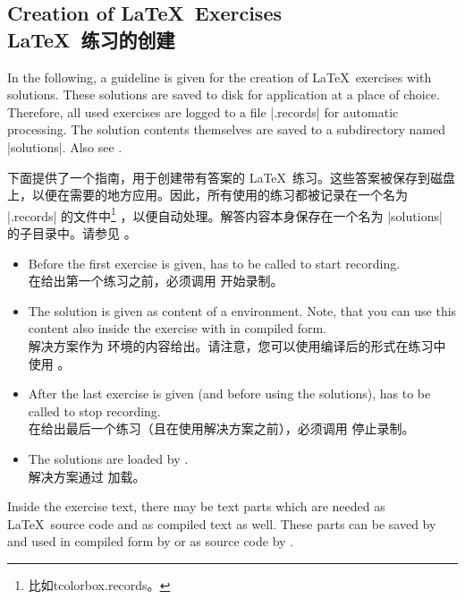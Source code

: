 \subsection{Creation of \LaTeX\ Exercises\\\LaTeX\ 练习的创建}\label{listing:exercises}

In the following, a guideline is given for the creation of \LaTeX\ exercises
with solutions. These solutions are saved to disk for application at a place of
choice.
Therefore, all used exercises are logged to a file |\jobname.records| for automatic
processing. The solution contents themselves are saved to a subdirectory named
|solutions|. Also see .

下面提供了一个指南，用于创建带有答案的 \LaTeX\ 练习。这些答案被保存到磁盘上，以便在需要的地方应用。因此，所有使用的练习都被记录在一个名为 |\jobname.records| 的文件中\footnote{比如tcolorbox.records。}%
，以便自动处理。解答内容本身保存在一个名为 |solutions| 的子目录中。请参见 。
\begin{itemize}
\item Before the first exercise is given,
 has to be called to start recording.
\\在给出第一个练习之前，必须调用  开始录制。
\item The solution is given as content of a 
environment. Note, that you can use this content also inside the
exercise with  in compiled form.
\\解决方案作为  环境的内容给出。请注意，您可以使用编译后的形式在练习中使用 。
\item After the last exercise is given (and before using the solutions),
 has to be called to stop recording.
\\在给出最后一个练习（且在使用解决方案之前），必须调用  停止录制。
\item The solutions are loaded by .
\\解决方案通过  加载。
\end{itemize}

Inside the exercise text, there may be text parts which are needed as
\LaTeX\ source code and as compiled text as well. These parts can be
saved by  and used in compiled form by 
or as source code by .

